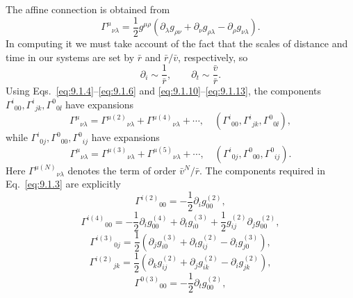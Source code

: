 The affine connection is obtained from
\[
  \Gamma^\mu{}_{\nu\lambda}
  =\frac12g^{\mu\rho}
  \left(
    \partial_\lambda g_{\rho\nu}
    +\partial_\nu g_{\rho\lambda}
    -\partial_\rho g_{\nu\lambda}
  \right).
\]
In computing it we must take account of the fact that the scales of distance
and time in our systems are set by \(\bar r\) and \(\bar r/\bar v\),
respectively, so
\[
  \partial_i\sim\frac1{\bar r},
  \qquad
  \partial_t\sim\frac{\bar v}{\bar r}.
\]
Using Eqs.~\eqref{eq:9.1.4}--\eqref{eq:9.1.6} and
\eqref{eq:9.1.10}--\eqref{eq:9.1.13}, the components
\(\Gamma^i{}_{00},\Gamma^i{}_{jk},\Gamma^0{}_{0\ii}\) have expansions
\begin{equation}
  \Gamma^\mu{}_{\nu\lambda}
  =\Gamma^{\mu(2)}{}_{\nu\lambda}
  +\Gamma^{\mu(4)}{}_{\nu\lambda}+\cdots,
  \quad
  (\Gamma^i{}_{00},\Gamma^i{}_{jk},\Gamma^0{}_{0\ii}),
  \tag{9.1.14}\label{eq:9.1.14}
\end{equation}
while \(\Gamma^i{}_{0j},\Gamma^0{}_{00},\Gamma^0{}_{ij}\) have expansions
\begin{equation}
  \Gamma^\mu{}_{\nu\lambda}
  =\Gamma^{\mu(3)}{}_{\nu\lambda}
  +\Gamma^{\mu(5)}{}_{\nu\lambda}+\cdots,
  \quad
  (\Gamma^i{}_{0j},\Gamma^0{}_{00},\Gamma^0{}_{ij}).
  \tag{9.1.15}\label{eq:9.1.15}
\end{equation}
Here \(\Gamma^{\mu(N)}{}_{\nu\lambda}\) denotes the term of order
\(\bar v^N/\bar r\). The components required in
Eq.~\eqref{eq:9.1.3} are explicitly
\begin{equation}
  \Gamma^{i(2)}{}_{00}=-\frac12\partial_i g_{00}^{(2)},
  \tag{9.1.16}\label{eq:9.1.16}
\end{equation}
\begin{equation}
  \Gamma^{i(4)}{}_{00}
  =-\frac12\partial_i g_{00}^{(4)}
   +\partial_t g_{i0}^{(3)}
   +\frac12g_{ij}^{(2)}\partial_j g_{00}^{(2)},
  \tag{9.1.17}\label{eq:9.1.17}
\end{equation}
\begin{equation}
  \Gamma^{i(3)}{}_{0j}
  =\frac12\left(
    \partial_jg_{i0}^{(3)}
    +\partial_tg_{ij}^{(2)}
    -\partial_i g_{j0}^{(3)}
  \right),
  \tag{9.1.18}\label{eq:9.1.18}
\end{equation}
\begin{equation}
  \Gamma^{i(2)}{}_{jk}
  =\frac12\left(
    \partial_k g_{ij}^{(2)}
    +\partial_j g_{ik}^{(2)}
    -\partial_i g_{jk}^{(2)}
  \right),
  \tag{9.1.19}\label{eq:9.1.19}
\end{equation}
\begin{equation}
  \Gamma^{0(3)}{}_{00}=-\frac12\partial_tg_{00}^{(2)},
  \tag{9.1.20}\label{eq:9.1.20}
\end{equation}
